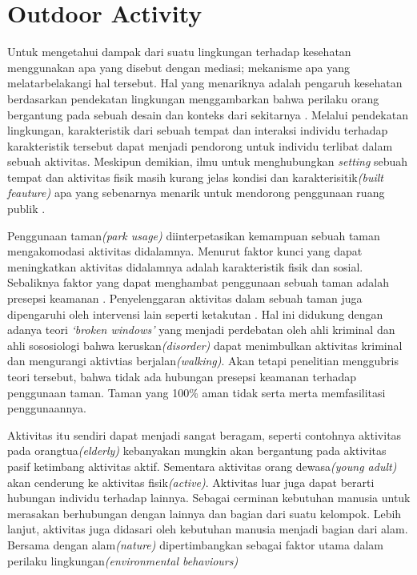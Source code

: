 \documentclass[../projects/thesis.tex]{subfiles}
\begin{document}
\section{Outdoor Activity}

Untuk mengetahui dampak dari suatu lingkungan terhadap kesehatan \cite{lachowycz2013towards} menggunakan apa yang disebut dengan mediasi; mekanisme apa yang melatarbelakangi hal tersebut. Hal yang menariknya adalah pengaruh kesehatan berdasarkan pendekatan lingkungan menggambarkan bahwa perilaku orang bergantung pada sebuah desain dan konteks dari sekitarnya \citep{cohen2010parks}. Melalui pendekatan lingkungan, karakteristik dari sebuah tempat dan interaksi individu terhadap karakteristik tersebut dapat menjadi pendorong untuk individu terlibat dalam sebuah aktivitas. Meskipun demikian, ilmu untuk menghubungkan \textit{setting} sebuah tempat dan aktivitas fisik masih kurang jelas kondisi dan karakterisitik\textit{(built feauture)} apa yang sebenarnya menarik untuk mendorong penggunaan ruang publik \citep{rull2005prescription,cohen2010parks}.

Penggunaan taman\textit{(park usage)} diinterpetasikan kemampuan sebuah taman mengakomodasi aktivitas didalamnya. Menurut \cite{cohen2010parks} faktor kunci yang dapat meningkatkan aktivitas didalamnya adalah karakteristik fisik dan sosial. Sebaliknya faktor yang dapat menghambat penggunaan sebuah taman adalah presepsi keamanan \citep{molnar2004unsafe,gomez2004violent,centers1999neighborhood}. Penyelenggaran aktivitas dalam sebuah taman juga dipengaruhi oleh intervensi lain seperti ketakutan \cite{roman2013pathways}.
Hal ini didukung dengan adanya teori \textit{`broken windows'}\citep{kelling1997fixing} yang menjadi perdebatan oleh ahli kriminal dan ahli sososiologi bahwa keruskan\textit{(disorder)} dapat menimbulkan aktivitas kriminal dan mengurangi aktivtias berjalan\textit{(walking)}. Akan tetapi penelitian \citep{cohen2010parks} menggubris teori tersebut, bahwa tidak ada hubungan presepsi keamanan terhadap penggunaan taman. Taman yang 100\% aman tidak serta merta memfasilitasi penggunaannya.

Aktivitas itu sendiri dapat menjadi sangat beragam, seperti contohnya aktivitas pada orangtua\textit{(elderly)} kebanyakan mungkin akan bergantung pada aktivitas pasif ketimbang aktivitas aktif. Sementara aktivitas orang dewasa\textit{(young adult)} akan cenderung ke aktivitas fisik\textit{(active)}. Aktivitas luar juga dapat berarti hubungan individu terhadap lainnya. Sebagai cerminan kebutuhan manusia untuk merasakan berhubungan dengan lainnya dan bagian dari suatu kelompok\citep{junot2017passion}. Lebih lanjut, aktivitas juga didasari oleh kebutuhan manusia menjadi bagian dari alam\citep{junot2017passion,nabhan1993loss}. Bersama dengan alam\textit{(nature)} dipertimbangkan sebagai faktor utama dalam perilaku lingkungan\textit{(environmental behaviours)}\citep{capaldi2014relationship,dutcher2007connectivity,kals1999emotional,mayer2004connectedness}
\end{document}
